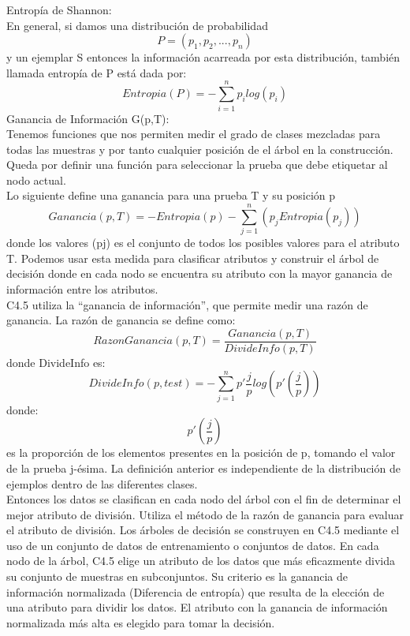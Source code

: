 \documentclass{article}
\begin{document}
Entropía de Shannon:\\
En general, si damos una distribución de probabilidad \[P = (p_1, p_2,..., p_n)\] y un ejemplar S entonces la información acarreada por esta distribución, también llamada entropía de P está dada por:\\
 \begin{equation*}
 Entropia(P) = -\sum_{i=1}^{n}p_ilog(p_i)
 \end{equation*}
Ganancia de Información G(p,T):\\
Tenemos funciones que nos permiten medir el grado de clases mezcladas para todas las muestras y por tanto cualquier posición de el árbol en la construcción. Queda por definir una función para seleccionar la prueba que debe etiquetar al nodo actual.\\
Lo siguiente define una ganancia para una prueba T y su posición p
 \begin{equation*}
 Ganancia(p,T) = -Entropia(p) - \sum_{j=1}^{n}(p_jEntropia(p_j))
 \end{equation*}
donde los valores (pj) es el conjunto de todos los posibles valores para el atributo T.
Podemos usar esta medida para clasificar atributos y construir el árbol de decisión donde en cada nodo se encuentra su atributo con la mayor ganancia de información entre los atributos.\\
C4.5 utiliza la “ganancia de información”, que permite medir una razón de ganancia.
 La razón de ganancia se define como:\\
 $$ RazonGanancia(p,T) = \frac{Ganancia(p,T)}{DivideInfo(p,T)} $$
 donde DivideInfo es:\\
 \begin{equation*}
 DivideInfo(p,test) = - \sum_{j=1}^{n}p'\frac{j}{p}log(p'(\frac{j}{p}))
 \end{equation*}
donde: $$ p'(\frac{j}{p})$$
es la proporción de los elementos presentes en la posición de p, tomando el valor de la prueba j-ésima. La definición anterior es independiente de la distribución de ejemplos dentro de las diferentes clases.\\
Entonces los datos se clasifican en cada nodo del árbol con el fin de determinar el mejor atributo de división. Utiliza el método de la razón de ganancia para evaluar el atributo de división.
Los árboles de decisión se construyen en C4.5 mediante el uso de un conjunto de datos de entrenamiento o conjuntos de datos. En cada nodo de la árbol, C4.5 elige un atributo de los datos que más eficazmente divida su conjunto de muestras en subconjuntos.  Su criterio es la ganancia de información normalizada (Diferencia de entropía) que resulta de la elección de una atributo para dividir los datos. El atributo con la ganancia de información normalizada más alta es elegido para tomar la decisión.\\
\end{document}
